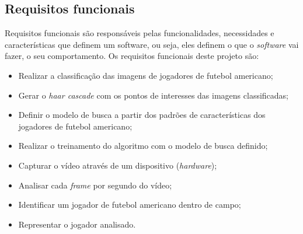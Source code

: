 \subsection{{Requisitos funcionais}}

Requisitos funcionais são responsáveis pelas funcionalidades, necessidades e características que definem um software, ou seja, eles definem o que o \textit{software} vai fazer, o seu comportamento. Os requisitos funcionais deste projeto são:

\begin{itemize}
\raggedright \item Realizar a classificação das imagens de jogadores de futebol americano;

\raggedright \item Gerar o \textit{haar cascade} com os pontos de interesses das imagens classificadas;

\raggedright \item Definir o modelo de busca a partir dos padrões de características dos jogadores de futebol americano;

\raggedright \item Realizar o treinamento do algoritmo com o modelo de busca definido;

\raggedright \item Capturar o vídeo através de um dispositivo (\textit{hardware});

\raggedright \item Analisar cada \textit{frame} por segundo do vídeo;

\raggedright \item Identificar um jogador de futebol americano dentro de campo;

\raggedright \item Representar o jogador analisado.
\end{itemize}